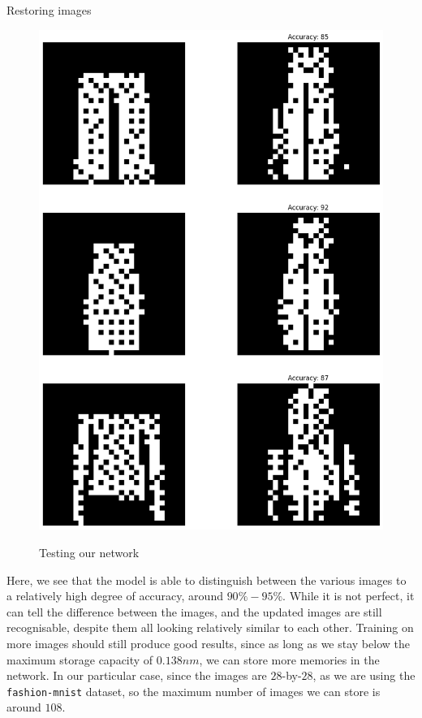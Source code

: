 \documentclass[25pt, a0paper, portrait]{beamer}
\newlength{\colwidth}
\begin{document}
\begin{frame}[t]
\begin{columns}[t]
\begin{column}{\colwidth}
\begin{block}{Restoring images}
\begin{figure}[ht]
{        \includegraphics[width=\linewidth]{bwoutput2}%
      }
      \caption{Testing our network}
    \end{figure}

    Here, we see that the model is able to distinguish between the various images to
    a relatively high degree of accuracy, around $90\% - 95\%$. While it is not perfect, it
    can tell the difference between the images, and the updated images are still
    recognisable, despite them all looking relatively similar to each other. Training on
    more images should still produce good results, since as long as we stay below the
    maximum storage capacity of $0.138nm$, we can store more memories in the network.
    In our particular case, since the images are $28$-by-$28$, as we are using the
    \texttt{fashion-mnist} dataset, so the maximum number of images we can store is
    around $108$.


\end{block}
\end{column}
\end{columns}
\end{frame}
\end{document}
